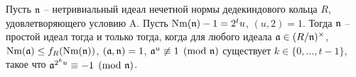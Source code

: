 \documentclass[_00_dissertation.tex]{subfiles}
\begin{document}
\begin{theorem}\label{theorem:miller_criteria_deterministic}
    Пусть $\mathfrak{n}$ -- нетривиальный идеал нечетной нормы дедекиндового кольца $R$, удовлетворяющего условию A.
    Пусть $\textrm{Nm}(\mathfrak{n}) - 1 = 2^t u$, $(u, 2) = 1$.
    Тогда $\mathfrak{n}$ -- простой идеал тогда и только тогда, когда для любого идеала $\mathfrak{a} \in (R/\mathfrak{n})^{\times}$, $\textrm{Nm}(\mathfrak{a}) \le f_R(\textrm{Nm}(\mathfrak{n}))$, $(\mathfrak{a}, \mathfrak{n}) = 1$, $\mathfrak{a}^u \not\equiv 1 \pmod{\mathfrak{n}}$ существует $k\in \{0, \dots, t-1\}$, такое что $\mathfrak{a}^{2^{k}u} \equiv -1 \pmod{\mathfrak{n}}$.
\end{theorem}
%

\onlyinsubfile{
    
    
}
\end{document}

